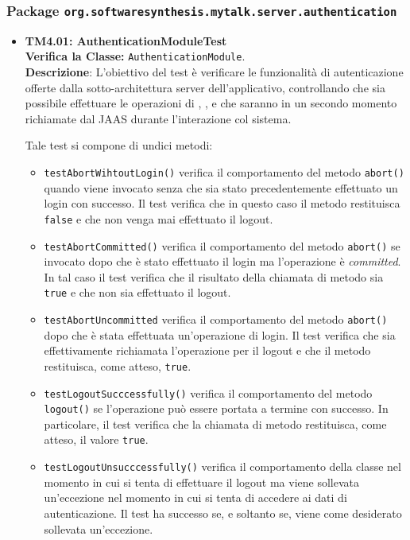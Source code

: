 \subsubsection{Package \texttt{org.softwaresynthesis.mytalk.server.authentication}}
\begin{itemize}

\item[\passed] \textbf{TM4.01: AuthenticationModuleTest}\\
\textbf{Verifica la Classe:} \texttt{AuthenticationModule}.\\
\textbf{Descrizione}: L'obiettivo del test è verificare le funzionalità di autenticazione offerte dalla sotto-architettura server dell'applicativo, controllando che sia possibile effettuare le operazioni di , ,  e  che saranno in un secondo momento richiamate dal  JAAS durante l'interazione col sistema.

Tale test si compone di undici metodi:
\begin{itemize}
\item \texttt{testAbortWihtoutLogin()} verifica il comportamento del metodo \texttt{abort()} quando viene invocato senza che sia stato precedentemente effettuato un login con successo. Il test verifica che in questo caso il metodo restituisca \texttt{false} e che non venga mai effettuato il logout.

\item \texttt{testAbortCommitted()} verifica il comportamento del metodo \texttt{abort()} se invocato dopo che è stato effettuato il login ma l'operazione è \textit{committed}. In tal caso il test verifica che il risultato della chiamata di metodo sia \texttt{true} e che non sia effettuato il logout.

\item \texttt{testAbortUncommitted} verifica il comportamento del metodo \texttt{abort()} dopo che è stata effettuata un'operazione di login. Il test verifica che sia effettivamente richiamata l'operazione per il logout e che il metodo restituisca, come atteso, \texttt{true}.

\item \texttt{testLogoutSucccessfully()} verifica il comportamento del metodo \texttt{logout()} se l'operazione può essere portata a termine con successo. In particolare, il test verifica che la chiamata di metodo restituisca, come atteso, il valore \texttt{true}.

\item \texttt{testLogoutUnsucccessfully()} verifica il comportamento della classe nel momento in cui si tenta di effettuare il logout ma viene sollevata un'eccezione nel momento in cui si tenta di accedere ai dati di autenticazione. Il test ha successo se, e soltanto se, viene come desiderato sollevata un'eccezione.


\end{itemize}
\end{itemize}
